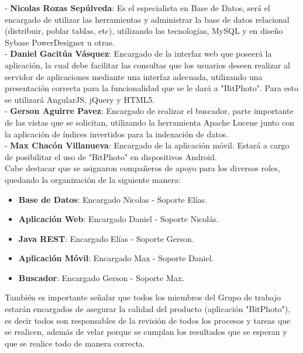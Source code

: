 \documentclass{memoria}
\begin{document}
- \textbf{Nicolas Rozas Sepúlveda}: Es el especialista en Base de Datos, será el encargado de utilizar las herramientas y administrar la base de datos relacional (distribuir, poblar tablas, etc), utilizando las tecnologías, MySQL y en diseño Sybase PowerDesigner u otras.\\

- \textbf{Daniel Gacitúa Vásquez}: Encargado de la interfaz web que poseerá la aplicación, la cual debe  facilitar las consultas que los usuarios deseen realizar al servidor de aplicaciones mediante una interfaz adecuada, utilizando una presentación correcta para la funcionalidad que se le dará a "BitPhoto". Para esto se utilizará AngularJS, jQuery y HTML5.\\

- \textbf{Gerson Aguirre Pavez}: Encargado de realizar el buscador, parte importante de las vistas que se solicitan, utilizando la herramienta Apache Lucene junto con la aplicación de índices invertidos para la indexación de datos.\\

- \textbf{Max Chacón Villanueva}: Encargado de la aplicación móvil. Estará a cargo de posibilitar el uso de "BitPhoto" en dispositivos Android.\\


Cabe destacar que se asignaron compañeros de apoyo para los diversos roles, quedando la organización de la siguiente manera:

\begin{itemize}
	\item \textbf{Base de Datos}: Encargado Nicolas - Soporte Elías.
	\item \textbf{Aplicación Web}: Encargado Daniel - Soporte Nicolás.
	\item \textbf{Java REST}: Encargado Elías - Soporte Gerson.
	\item \textbf{Aplicación Móvil}: Encargado Max - Soporte Daniel.
	\item \textbf{Buscador}: Encargado Gerson - Soporte Max.
\end{itemize}

También es importante señalar que todos los miembros del Grupo de trabajo estarán encargados de asegurar la calidad del producto (aplicación "BitPhoto"), es decir todos son responsables de la revisión de todos los procesos y tareas que se realicen, además de velar porque se cumplan los resultados que se esperan y que se realice todo de manera correcta.

\newpage
\end{document}
